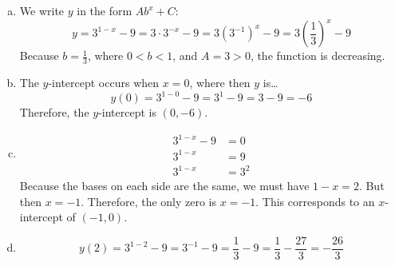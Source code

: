 \documentclass[11pt,letterpaper]{article}
\begin{document}
\sol
\begin{enumerate}[(a)]
\item We write $y$ in the form $Ab^x + C$:
	\[
	y= 3^{1-x} - 9= 3 \cdot 3^{-x} - 9= 3 (3^{-1})^x - 9= 3 \left( \dfrac{1}{3} \right)^x - 9
	\]
Because $b= \frac{1}{3}$, where $0 < b < 1$, and $A= 3 > 0$, the function is decreasing. \pspace

\item The $y$-intercept occurs when $x= 0$, where then $y$ is\dots
	\[
	y(0)= 3^{1 - 0} - 9= 3^1 - 9= 3 - 9= -6
	\]
Therefore, the $y$-intercept is $(0, -6)$. \pspace

\item 
	\[
	\begin{aligned}
	3^{1-x} - 9&= 0 \\[0.3cm]
	3^{1 - x}&= 9 \\[0.3cm]
	3^{1 - x}&= 3^2
	\end{aligned}
	\]
Because the bases on each side are the same, we must have $1 - x= 2$. But then $x= -1$. Therefore, the only zero is $x= -1$. This corresponds to an $x$-intercept of $(-1, 0)$. \pspace

\item 
	\[
	y(2)= 3^{1 - 2} - 9= 3^{-1} - 9= \dfrac{1}{3} - 9= \frac{1}{3} - \dfrac{27}{3}= -\dfrac{26}{3}
	\]
\end{enumerate}


\end{document}
